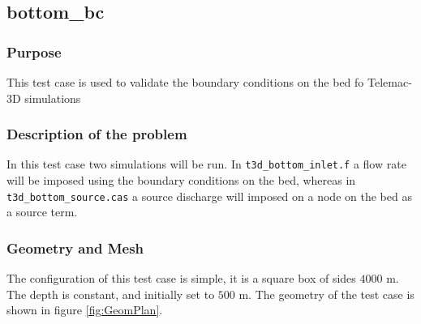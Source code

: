 \subsection{bottom\_bc}%
%

%
\subsubsection{Purpose}
%
This test case is used to validate the boundary conditions on the bed fo
Telemac-3D simulations
%
\subsubsection{Description of the problem}
%
In this test case two simulations will be run. In \texttt{t3d\_bottom\_inlet.f}
a flow rate will be imposed using the boundary conditions on the bed, whereas
in \texttt{t3d\_bottom\_source.cas} a source discharge will imposed on a node
on the bed as a source term.


%

%
%
\subsubsection{Geometry and Mesh}
%
The configuration of this test case is simple, it is a square box of sides
$4000$ m. The depth is constant, and initially set to $500$ m. The geometry of
the test case is shown in figure \ref{fig:GeomPlan}.

